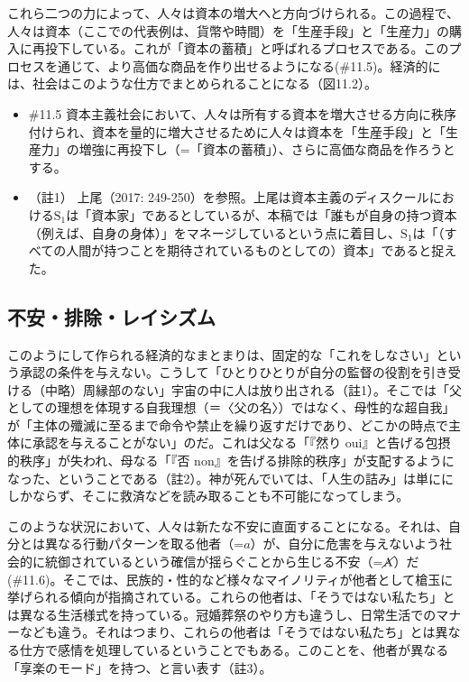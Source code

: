 これら二つの力によって、人々は資本の増大へと方向づけられる。この過程で、人々は資本（ここでの代表例は、貨幣や時間）を「生産手段」と「生産力」の購入に再投下している。これが「資本の蓄積」と呼ばれるプロセスである。このプロセスを通じて、より高価な商品を作り出せるようになる(\#11.5)。経済的には、社会はこのような仕方でまとめられることになる（図11.2）。

\begin{note}{}
  \begin{itemize}
    \tightlist
    \item{\#11.5}
      資本主義社会において、人々は所有する資本を増大させる方向に秩序付けられ、資本を量的に増大させるために人々は資本を「生産手段」と「生産力」の増強に再投下し（=「資本の蓄積」）、さらに高価な商品を作ろうとする。
  \end{itemize}
\end{note}

\begin{itemize}
\tightlist
\item
  （註1） 上尾（2017:
  249-250）\cite{Ueo}を参照。上尾は\mbox{資本主義のディスクール}における\(\textrm{S}_1\)は「資本家」であるとしているが、本稿では「誰もが自身の持つ資本（例えば、自身の身体）」をマネージしているという点に着目し、\(\textrm{S}_1\)は「（すべての人間が持つことを期待されているものとしての）資本」であると捉えた。
\end{itemize}

\subsection{不安・排除・レイシズム}\label{ux4e0dux5b89ux6392ux9664ux30ecux30a4ux30b7ux30baux30e0}

このようにして作られる経済的なまとまりは、固定的な「これをしなさい」という承認の条件を与えない。こうして「ひとりひとりが自分の監督の役割を引き受ける（中略）周縁部のない」宇宙の中に人は放り出される（註1）。そこでは「父としての理想を体現する自我理想（＝〈父の名〉）ではなく、母性的な超自我」が「主体の殲滅に至るまで命令や禁止を繰り返すだけであり、どこかの時点で主体に承認を与えることがない」のだ。これは父なる「『然り
oui』と告げる包摂的秩序」が失われ、母なる「『否
non』を告げる排除的秩序」が支配するようになった、ということである（註2）。神が死んでいては、「人生の詰み」は単ににしかならず、そこに救済などを読み取ることも不可能になってしまう。

このような状況において、人々は新たな不安に直面することになる。それは、自分とは異なる行動パターンを取る他者（=\(a\)）が、自分に危害を与えないよう社会的に統御されているという確信が揺らぐことから生じる不安（=\(\cancel{\textrm{A}}\)）だ(\#11.6)。そこでは、民族的・性的など様々なマイノリティが他者として槍玉に挙げられる傾向が指摘されている。これらの他者は、「そうではない私たち」とは異なる生活様式を持っている。冠婚葬祭のやり方も違うし、日常生活でのマナーなども違う。それはつまり、これらの他者は「そうではない私たち」とは異なる仕方で感情を処理しているということでもある。このことを、他者が異なる「享楽のモード」を持つ、と言い表す（註3）。

